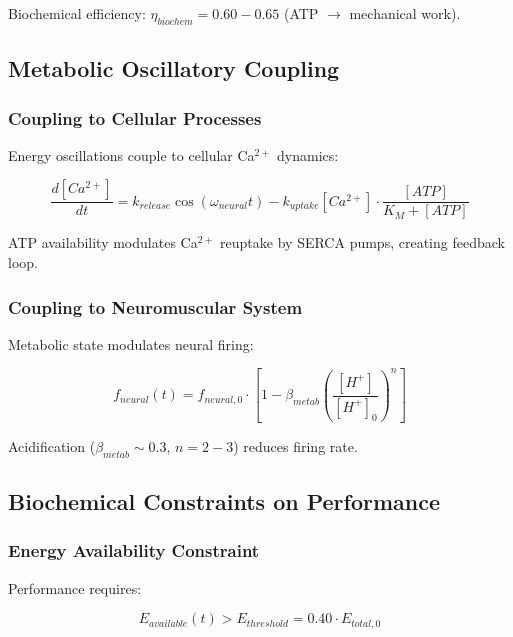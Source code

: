 Biochemical efficiency: $\eta_{biochem} = 0.60-0.65$ (ATP $\to$ mechanical work).

\subsection{Metabolic Oscillatory Coupling}

\subsubsection{Coupling to Cellular Processes}

Energy oscillations couple to cellular Ca$^{2+}$ dynamics:

\begin{equation}
\frac{d[Ca^{2+}]}{dt} = k_{release} \cos(\omega_{neural} t) - k_{uptake}[Ca^{2+}] \cdot \frac{[ATP]}{K_M + [ATP]}
\label{eq:calcium_coupling}
\end{equation}

ATP availability modulates Ca$^{2+}$ reuptake by SERCA pumps, creating feedback loop.

\subsubsection{Coupling to Neuromuscular System}

Metabolic state modulates neural firing:

\begin{equation}
f_{neural}(t) = f_{neural,0} \cdot \left[1 - \beta_{metab} \left(\frac{[H^+]}{[H^+]_0}\right)^n\right]
\label{eq:metabolic_neural_coupling}
\end{equation}

Acidification ($\beta_{metab} \sim 0.3$, $n = 2-3$) reduces firing rate.

\subsection{Biochemical Constraints on Performance}

\subsubsection{Energy Availability Constraint}

Performance requires:

\begin{equation}
E_{available}(t) > E_{threshold} = 0.40 \cdot E_{total,0}
\label{eq:energy_threshold}
\end{equation}

